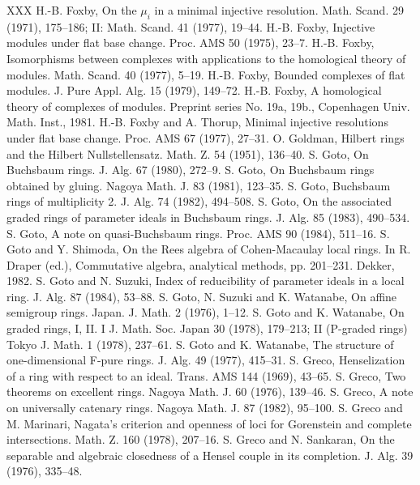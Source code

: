 \begin{thebibliography}{XXX}
 H.-B. Foxby, On the $\mu_i$ in a minimal injective resolution. Math. Scand. 29 (1971), 175--186; II: Math. Scand. 41 (1977), 19--44.
 H.-B. Foxby, Injective modules under flat base change. Proc. AMS 50 (1975), 23--7.
 H.-B. Foxby, Isomorphisms between complexes with applications to the homological theory of modules. Math. Scand. 40 (1977), 5--19.
 H.-B. Foxby, Bounded complexes of flat modules. J. Pure Appl. Alg. 15 (1979), 149--72.
 H.-B. Foxby, A homological theory of complexes of modules. Preprint series No. 19a, 19b., Copenhagen Univ. Math. Inst., 1981.
 H.-B. Foxby and A. Thorup, Minimal injective resolutions under flat base change. Proc. AMS 67 (1977), 27--31.
 O. Goldman, Hilbert rings and the Hilbert Nullstellensatz. Math. Z. 54 (1951), 136--40.
 S. Goto, On Buchsbaum rings. J. Alg. 67 (1980), 272--9.
 S. Goto, On Buchsbaum rings obtained by gluing. Nagoya Math. J. 83 (1981), 123--35.
 S. Goto, Buchsbaum rings of multiplicity 2. J. Alg. 74 (1982), 494--508.
 S. Goto, On the associated graded rings of parameter ideals in Buchsbaum rings. J. Alg. 85 (1983), 490--534.
 S. Goto, A note on quasi-Buchsbaum rings. Proc. AMS 90 (1984), 511--16.
 S. Goto and Y. Shimoda, On the Rees algebra of Cohen-Macaulay local rings. In R. Draper (ed.), Commutative algebra, analytical methods, pp. 201--231. Dekker, 1982.
 S. Goto and N. Suzuki, Index of reducibility of parameter ideals in a local ring. J. Alg. 87 (1984), 53--88.
 S. Goto, N. Suzuki and K. Watanabe, On affine semigroup rings. Japan. J. Math. 2 (1976), 1--12.
 S. Goto and K. Watanabe, On graded rings, I, II. I J. Math. Soc. Japan 30 (1978), 179--213; II (P-graded rings) Tokyo J. Math. 1 (1978), 237--61.
 S. Goto and K. Watanabe, The structure of one-dimensional F-pure rings. J. Alg. 49 (1977), 415--31.
 S. Greco, Henselization of a ring with respect to an ideal. Trans. AMS 144 (1969), 43--65.
 S. Greco, Two theorems on excellent rings. Nagoya Math. J. 60 (1976), 139--46.
 S. Greco, A note on universally catenary rings. Nagoya Math. J. 87 (1982), 95--100.
 S. Greco and M. Marinari, Nagata's criterion and openness of loci for Gorenstein and complete intersections. Math. Z. 160 (1978), 207--16.
 S. Greco and N. Sankaran, On the separable and algebraic closedness of a Hensel couple in its completion. J. Alg. 39 (1976), 335--48.

\end{thebibliography}
